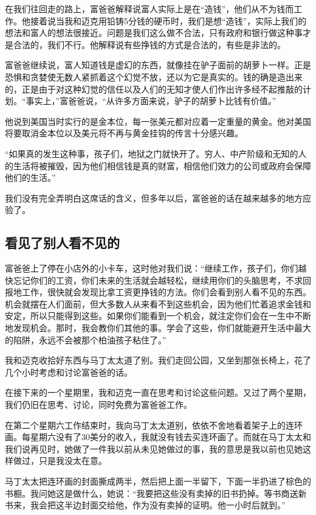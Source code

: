 在我们往回走的路上，富爸爸解释说富人实际上是在“造钱”，他们从不为钱而工作。他接着说当我和迈克用铅铸5分钱的硬币时，我们是想“造钱”，实际上我们的想法和富人的想法很接近。问题是我们这么做不合法，只有政府和银行做这种事才是合法的，我们不行。他解释说有些挣钱的方式是合法的，有些是非法的。

富爸爸继续说，富人知道钱是虚幻的东西，就像挂在驴子面前的胡萝卜一样。正是恐惧和贪婪使无数人紧抓着这个幻觉不放，还以为它是真实的。钱的确是造出来的，正是由于对这种幻觉的信任以及人们的无知才使人们作出许多经不起推敲的计划。“事实上，”富爸爸说，“从许多方面来说，驴子的胡萝卜比钱有价值。”

他说到美国当时实行的是金本位，每一张美元都对应着一定重量的黄金。他对美国将要取消金本位以及美元将不再与黄金挂钩的传言十分感兴趣。

“如果真的发生这种事，孩子们，地狱之门就快开了。穷人、中产阶级和无知的人的生活将被摧毁，因为他们相信钱是真的财富，相信他们效力的公司或政府会保障他们的生活。”

我们没有完全弄明白这席话的含义，但多年以后，富爸爸的话在越来越多的地方应验了。

\subsection*{看见了别人看不见的}
富爸爸上了停在小店外的小卡车，这时他对我们说：“继续工作，孩子们，你们越快忘记你们的工资，你们未来的生活就会越轻松，继续用你们的头脑思考，不求回报地工作，很快就会发现比拿工资更挣钱的方法。你们会看到别人看不见的东西。机会就摆在人们面前，但大多数人从来看不到这些机会，因为他们忙着追求金钱和安定，所以只能得到这些。如果你们能看到一个机会，就注定你们会在一生中不断地发现机会。那时，我会教你们其他的事。学会了这些，你们就能避开生活中最大的陷阱，永远不会被那个柏油孩子粘住了。”

我和迈克收拾好东西与马丁太太道了别。我们走回公园，又坐到那张长椅上，花了几个小时考虑和讨论富爸爸的话。

在接下来的一个星期里，我和迈克一直在思考和讨论这些问题。又过了两个星期，我们仍旧在思考、讨论，同时免费为富爸爸工作。

在第二个星期六工作结束时，我向马丁太太道别，依依不舍地看着架子上的连环画。每星期六没有了30美分的收入，我就没有钱去买连环画了。而就在马丁太太和我们说再见时，她做了一件我以前从未见她做过的事，我的意思是我以前也见她这样做过，只是我没太在意。

马丁太太把连环画的封面撕成两半，然后把上面一半留下，下面一半扔进了棕色的书橱。我问她这是做什么，她说：“我要把这些没有卖掉的旧书扔掉。等书商送新书来，我会把这半边封面交给他，作为没有卖掉的证明。他一小时后就到。”

